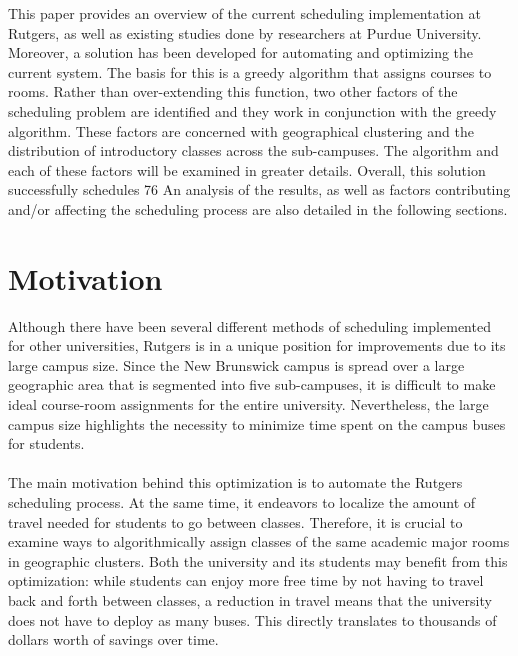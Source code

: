 \documentclass[12pt]{article}
\begin{document}
	This paper provides an overview of the current scheduling implementation at
	Rutgers, as well as existing studies done by researchers at Purdue University.
	Moreover, a solution has been developed for automating and optimizing the
	current system. The basis for this is a greedy algorithm that assigns courses
	to rooms. Rather than over-extending this function, two other factors of the
	scheduling problem are identified and they work in conjunction with the greedy
	algorithm. These factors are concerned with geographical clustering and the
	distribution of introductory classes across the sub-campuses. The algorithm and
	each of these factors will be examined in greater details. Overall, this
	solution successfully schedules 76%
	An analysis of the results, as well as factors contributing and/or affecting
	the scheduling process are also detailed in the following sections.

\section{Motivation}
	Although there have been several different methods of scheduling implemented
	for other universities, Rutgers is in a unique position for improvements due to
	its large campus size. Since the New Brunswick campus is spread over a large
	geographic area that is segmented into five sub-campuses, it is difficult to
	make ideal course-room assignments for the entire university. Nevertheless,
	the large campus size highlights the necessity to minimize time spent on the
	campus buses for students. 
	\\\\
	The main motivation behind this optimization is to automate the Rutgers
	scheduling process. At the same time, it endeavors to localize the amount of
	travel needed for students to go between classes. Therefore, it is crucial to
	examine ways to algorithmically assign classes of the same academic major rooms
	in geographic clusters. Both the university and its students may benefit from
	this optimization: while students can enjoy more free time by not having to
	travel back and forth between classes, a reduction in travel means that the
	university does not have to deploy as many buses. This directly translates to
	thousands of dollars worth of savings over time. 
\end{document}

